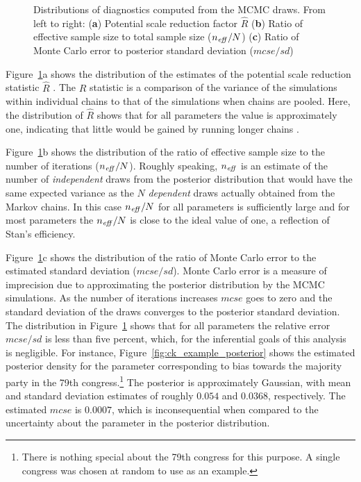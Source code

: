 \begin{figure}[t]
\caption{Distributions of diagnostics computed from the MCMC draws. From left to right: \newline ({\bf a}) Potential scale reduction factor $\hat{R}$ \newline ({\bf b}) Ratio of effective sample size to total sample size ($n_{\it eff}/N$) \newline ({\bf c}) Ratio of Monte Carlo error to posterior standard deviation ($mcse/sd$)}
\label{fig:ck_diagnostics}
\end{figure}

Figure~{\ref{fig:ck_diagnostics}a} shows the distribution of the estimates of the potential scale reduction statistic $\hat{R}$  . The $\hat{R}$ statistic is a comparison of the variance of the simulations within individual chains to that of the simulations when chains are pooled. Here, the distribution of $\hat{R}$ shows that for all parameters the value is approximately one, indicating that little would be gained by running longer chains . 

Figure~{\ref{fig:ck_diagnostics}b} shows the distribution of the ratio of effective sample size to the number of iterations ($n_{\it eff}/N$). Roughly speaking, $n_{\it eff}$ is an estimate of the number of {\it independent} draws from the posterior distribution that would have the same expected variance as the $N$ {\it dependent} draws actually obtained from the Markov chains. In this case $n_{\it eff}/N$ for all parameters is sufficiently large and for most parameters the $n_{\it eff}/N$ is close to the ideal value of one, a reflection of Stan's efficiency. 


Figure~{\ref{fig:ck_diagnostics}c} shows the distribution of the ratio of Monte Carlo error to the estimated standard deviation ($mcse/sd$). Monte Carlo error is a measure of imprecision due to approximating the posterior distribution by the MCMC simulations. As the number of iterations increases $mcse$ goes to zero and the standard deviation of the draws converges to the posterior standard deviation. The distribution in Figure~\ref{fig:ck_diagnostics} shows that for all parameters the relative error $mcse/sd$ is less than five percent, which, for the inferential goals of this analysis is negligible. For instance, Figure~\ref{fig:ck_example_posterior} shows the estimated posterior density for the parameter corresponding to bias towards the majority party in the 79th congress.\footnote{There is nothing special about the 79th congress for this purpose. A single congress was chosen at random to use as an example.} The posterior is approximately Gaussian, with mean and standard deviation estimates of roughly $0.054$ and $0.0368$, respectively. The estimated $mcse$ is $0.0007$, which is inconsequential when compared to the uncertainty about the parameter in the posterior distribution.   


